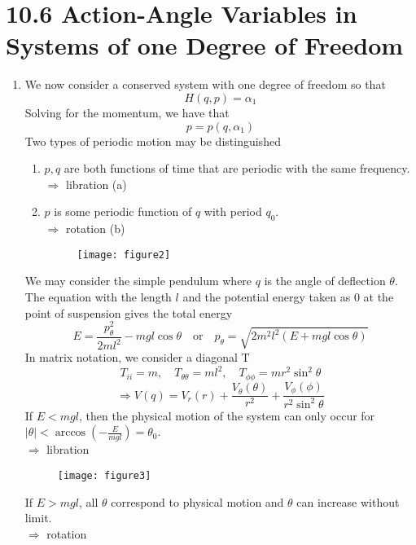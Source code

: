 \documentclass{article}
\begin{document}
	\section*{10.6 Action-Angle Variables in Systems of one Degree of Freedom}
	\begin{enumerate}
		\item We now consider a conserved system with one degree of freedom so that
		\[ H(q,p) = \alpha_1 \]
		Solving for the momentum, we have that
		\[ p = p(q, \alpha_1) \]
		Two types of periodic motion may be distinguished
		\begin{enumerate}
			\item $p, q$ are both functions of time that are periodic with the same frequency. \\
			$\Rightarrow$ libration (a)
			\item $p$ is some periodic function of $q$ with period $q_0$. \\
			$\Rightarrow$ rotation (b) \\
			
			\begin{figure}[h]
				\centering
				\texttt{[image: figure2]}
				\caption{}
				\label{fig:figure2}
			\end{figure}
			
		\end{enumerate}
		We may consider the simple pendulum where $q$ is the angle of deflection $\theta$. The equation with the length $l$ and the potential energy taken as 0 at the point of suspension gives the total energy
		\[ E = \frac{p_\theta^2}{2ml^2} - mgl \cos\theta \quad \text{or} \quad p_\theta = \sqrt{2m^2l^2(E+mgl\cos\theta)} \]
		In matrix notation, we consider a diagonal T
		\[ T_{ii} = m, \quad T_{\theta\theta} = ml^2, \quad T_{\phi\phi} = mr^2\sin^2\theta \]
		\[ \Rightarrow V(q) = V_r(r) + \frac{V_\theta(\theta)}{r^2} + \frac{V_\phi(\phi)}{r^2\sin^2\theta} \]
		If $E < mgl$, then the physical motion of the system can only occur for $|\theta| < \arccos(-\frac{E}{mgl}) = \theta_0$. \\
		$\Rightarrow$ libration \\
		
		\begin{figure}[h]
			\centering
			\texttt{[image: figure3]}
			\caption{}
			\label{fig:figure3}
		\end{figure}
		
		If $E > mgl$, all $\theta$ correspond to physical motion and $\theta$ can increase without limit. \\
		$\Rightarrow$ rotation
		

\end{enumerate}
\end{document}
